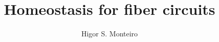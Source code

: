 \documentclass[12pt]{article}
\begin{document}
\title{Homeostasis for fiber circuits}
\author{Higor S. Monteiro}

\maketitle

\tableofcontents





%





\end{document}
